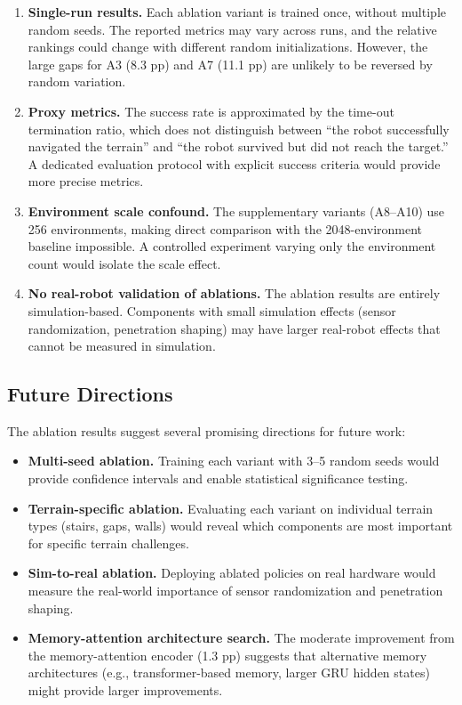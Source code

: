 \begin{enumerate}
    \item \textbf{Single-run results.} Each ablation variant is trained once, without multiple random seeds. The reported metrics may vary across runs, and the relative rankings could change with different random initializations. However, the large gaps for A3 (8.3 pp) and A7 (11.1 pp) are unlikely to be reversed by random variation.
    \item \textbf{Proxy metrics.} The success rate is approximated by the time-out termination ratio, which does not distinguish between ``the robot successfully navigated the terrain'' and ``the robot survived but did not reach the target.'' A dedicated evaluation protocol with explicit success criteria would provide more precise metrics.
    \item \textbf{Environment scale confound.} The supplementary variants (A8--A10) use 256 environments, making direct comparison with the 2048-environment baseline impossible. A controlled experiment varying only the environment count would isolate the scale effect.
    \item \textbf{No real-robot validation of ablations.} The ablation results are entirely simulation-based. Components with small simulation effects (sensor randomization, penetration shaping) may have larger real-robot effects that cannot be measured in simulation.
\end{enumerate}

\subsection{Future Directions}

The ablation results suggest several promising directions for future work:

\begin{itemize}
    \item \textbf{Multi-seed ablation.} Training each variant with 3--5 random seeds would provide confidence intervals and enable statistical significance testing.
    \item \textbf{Terrain-specific ablation.} Evaluating each variant on individual terrain types (stairs, gaps, walls) would reveal which components are most important for specific terrain challenges.
    \item \textbf{Sim-to-real ablation.} Deploying ablated policies on real hardware would measure the real-world importance of sensor randomization and penetration shaping.
    \item \textbf{Memory-attention architecture search.} The moderate improvement from the memory-attention encoder (1.3 pp) suggests that alternative memory architectures (e.g., transformer-based memory, larger GRU hidden states) might provide larger improvements.
\end{itemize}